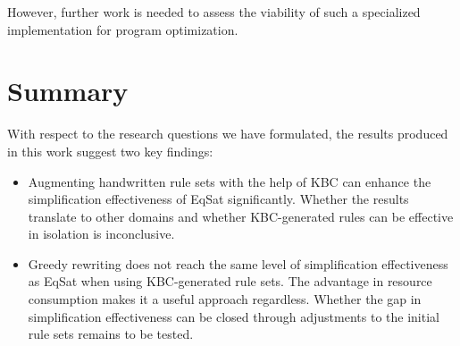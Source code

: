 However, further work is needed to assess the viability of such a specialized implementation for program optimization.

\section{Summary}
With respect to the research questions we have formulated, the results produced in this work suggest two key findings:
\begin{itemize}
	\item Augmenting handwritten rule sets with the help of KBC can enhance the simplification effectiveness of EqSat significantly. Whether the results translate to other domains and whether KBC-generated rules can be effective in isolation is inconclusive.
	\item Greedy rewriting does not reach the same level of simplification effectiveness as EqSat when using KBC-generated rule sets. The advantage in resource consumption makes it a useful approach regardless. Whether the gap in simplification effectiveness can be closed through adjustments to the initial rule sets remains to be tested.
\end{itemize}
